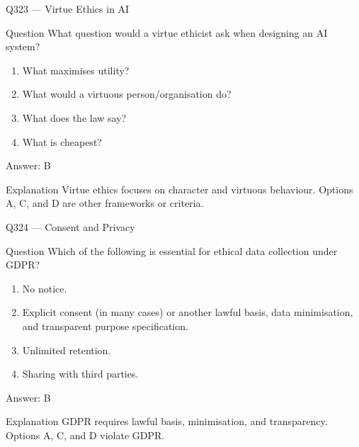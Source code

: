 \documentclass[aspectratio=169,8pt]{beamer}
\begin{document}
\begin{frame}{Q323 --- Virtue Ethics in AI}
	\begin{block}{Question}
		What question would a virtue ethicist ask when designing an AI system?
		\begin{enumerate}
			\item What maximises utility?
			\item What would a virtuous person/organisation do?
			\item What does the law say?
			\item What is cheapest?
	\end{enumerate}  \end{block}
	\begin{exampleblock}{Answer: B}\end{exampleblock}
	\begin{block}{Explanation}
		Virtue ethics focuses on character and virtuous behaviour. Options A, C, and D are other frameworks or criteria.
	\end{block}
\end{frame}

\begin{frame}{Q324 --- Consent and Privacy}
	\begin{block}{Question}
		Which of the following is essential for ethical data collection under GDPR?
		\begin{enumerate}
			\item No notice.
			\item Explicit consent (in many cases) or another lawful basis, data minimisation, and transparent purpose specification.
			\item Unlimited retention.
			\item Sharing with third parties.
	\end{enumerate}  \end{block}
	\begin{exampleblock}{Answer: B}\end{exampleblock}
	\begin{block}{Explanation}
		GDPR requires lawful basis, minimisation, and transparency. Options A, C, and D violate GDPR.
	\end{block}
\end{frame}
\end{document}
